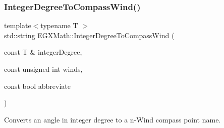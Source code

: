 \subsubsection{\texorpdfstring{Integer\+Degree\+To\+Compass\+Wind()}{IntegerDegreeToCompassWind()}}
{\footnotesize\ttfamily template$<$typename T $>$ \\
std\+::string E\+G\+X\+Math\+::\+Integer\+Degree\+To\+Compass\+Wind (\begin{DoxyParamCaption}\item[{const T \&}]{integer\+Degree,  }\item[{const unsigned int}]{winds,  }\item[{const bool}]{abbreviate }\end{DoxyParamCaption})}



Converts an angle in integer degree to a n-\/\+Wind compass point name. 

